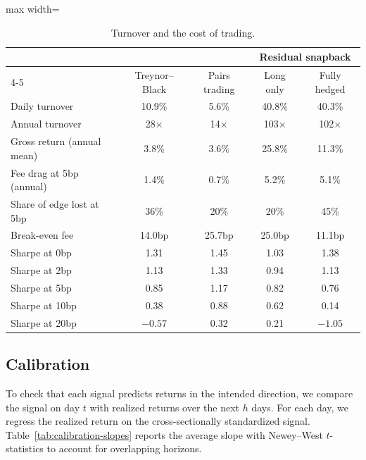 \documentclass[11pt,letterpaper]{article}
\begin{document}
\begin{table}[!htbp]
    \centering
    \caption{Turnover and the cost of trading.}
    \label{tab:costs}
    \begin{adjustbox}{max width=\linewidth}
        \begin{tabular}{lcccc}
            \toprule
            & & & \multicolumn{2}{c}{Residual snapback} \\
            \cmidrule(lr){4-5}
            & Treynor--Black & Pairs trading & Long only & Fully hedged \\
            \midrule
            Daily turnover & 10.9\% & 5.6\% & 40.8\% & 40.3\% \\
            Annual turnover & 28$\times$ & 14$\times$ & 103$\times$ & 102$\times$ \\
            Gross return (annual mean) & 3.8\% & 3.6\% & 25.8\% & 11.3\% \\
            Fee drag at 5bp (annual) & 1.4\% & 0.7\% & 5.2\% & 5.1\% \\
            Share of edge lost at 5bp & 36\% & 20\% & 20\% & 45\% \\
            Break-even fee & 14.0bp & 25.7bp & 25.0bp & 11.1bp \\
            \midrule
            Sharpe at 0bp & 1.31 & 1.45 & 1.03 & 1.38 \\
            Sharpe at 2bp & 1.13 & 1.33 & 0.94 & 1.13 \\
            Sharpe at 5bp & 0.85 & 1.17 & 0.82 & 0.76 \\
            Sharpe at 10bp & 0.38 & 0.88 & 0.62 & 0.14 \\
            Sharpe at 20bp & $-0.57$ & 0.32 & 0.21 & $-1.05$ \\
            \bottomrule
        \end{tabular}
    \end{adjustbox}
\end{table}

\subsection{Calibration}

To check that each signal predicts returns in the intended direction, we compare the signal
on day $t$ with realized returns over the next $h$ days. For each day, we regress the
realized return on the cross-sectionally standardized signal.
Table~\ref{tab:calibration-slopes} reports the average slope with Newey--West $t$-statistics
to account for overlapping horizons.
\end{document}
